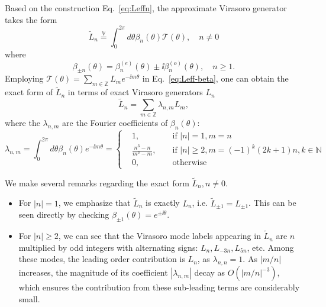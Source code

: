 \documentclass[12pt, nofootinbib]{article}
\theoremstyle{plain}
\theoremstyle{assumption}
\theoremstyle{definition}
\theoremstyle{plain}
\theoremstyle{plain}
\theoremstyle{plain}
\theoremstyle{plain}
\theoremstyle{plain}
\def\veq{\stackrel{\mathbb{V}}{=}}
\def\Leff{\widetilde{L}}
\def\Tcft{\mathscr{T}}
\def\betae{\beta^{(e)}}
\def\betao{\beta^{(o)}}
\begin{document}
Based on the construction Eq.~\eqref{eq:Leffn}, the approximate Virasoro generator takes the form
\begin{equation}\label{eq:Leff-beta}
    \Leff_{n} \veq \int_{0}^{2\pi}d\theta\beta_{n}(\theta) \Tcft(\theta), \quad n\neq 0
\end{equation}
where 
\begin{equation}
    \beta_{\pm n}(\theta) = \betae_n(\theta) \pm \ii \betao_n(\theta),\quad n\geq 1. 
\end{equation}
Employing $ \Tcft(\theta) = \sum_{m\in\mathbb{Z}} L_m e^{-\ii m\theta}$ in Eq.~\eqref{eq:Leff-beta}, one can obtain the exact form of $\Leff_n$ in terms of exact Virasoro generators $L_n$ 
\begin{equation}\label{eq:Leffn-exact}
    \Leff_n = \sum_{m\in\mathbb{Z}} \lambda_{n,m} L_m,
\end{equation}
where the $\lambda_{n,m}$ are the Fourier coefficients of $\beta_n(\theta)$: 
\begin{equation}\label{eq:lambda-nm}
    \lambda_{n,m} = \int_{0}^{2\pi}d\theta \beta_n(\theta)e^{-\ii m\theta}  
     = \left\{\begin{aligned}
         & 1, & & \text{ if } |n| = 1,m=n \\
         &\frac{n^3-n}{m^3-m},& &\text{ if } |n|\geq 2, m = (-1)^{k}(2k+1)n, k \in \mathbb{N} \\ 
         &0,& &\text{ otherwise}
     \end{aligned}
     \right.
\end{equation}

We make several remarks regarding the exact form $\Leff_n,n\neq 0$. 
\begin{itemize}
    \item For $|n|=1$, we emphasize that $\Leff_n$ is exactly $L_n$, i.e. $\Leff_{\pm 1} = L_{\pm 1}$. This can be seen directly by checking $\beta_{\pm 1}(\theta) = e^{\pm \ii \theta}$.
    \item For $|n|\geq 2$, we can see that the Virasoro mode labels appearing in $\Leff_n$ are 
    $n$ multiplied by odd integers with alternating signs: $L_n, L_{-3n},L_{5n}$, etc. Among these modes, the leading order contribution is $L_n$, as $\lambda_{n,n}=1$. As $|m/n|$ increases, the magnitude of its coefficient $|\lambda_{n,m}|$ decay as $O(|m/n|^{-3})$, which ensures the contribution from these sub-leading terms are considerably small. 
\end{itemize}
\end{document}
